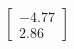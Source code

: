 \documentclass[preview]{standalone}
\begin{document}
\begin{align*}
\begin{bmatrix} -4.77 \\ 2.86 \end{bmatrix}
\end{align*}
\end{document}
